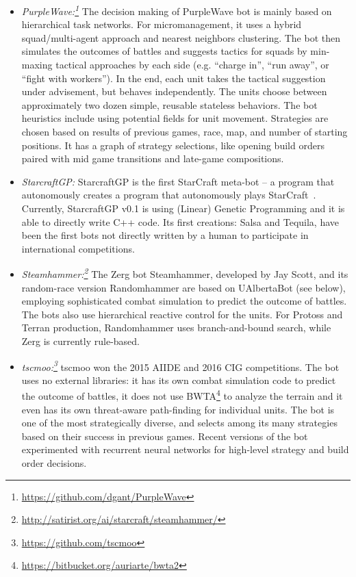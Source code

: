 \begin{itemize}
  \item {\em PurpleWave:\footnote{\url{https://github.com/dgant/PurpleWave}}} The decision making of PurpleWave bot is mainly based on hierarchical task networks. For micromanagement, it uses a hybrid squad/multi-agent approach and nearest neighbors clustering. The bot then simulates the outcomes of battles and suggests tactics for squads by min-maxing tactical approaches by each side (e.g. ``charge in'', ``run away'', or ``fight with workers''). In the end, each unit takes the tactical suggestion under advisement, but behaves independently. The units choose between approximately two dozen simple, reusable stateless behaviors. The bot heuristics include using potential fields for unit movement. Strategies are chosen based on results of previous games, race, map, and number of starting positions. It has a graph of strategy selections, like opening build orders paired with mid game transitions and late-game compositions.
  	
  \item {\em StarcraftGP:} StarcraftGP is the first StarCraft meta-bot -- a program that autonomously creates a program that autonomously plays StarCraft~\cite{garcia2015towards}. Currently, StarcraftGP v0.1 is using (Linear) Genetic Programming and it is able to directly write C++ code. Its first creations: Salsa and Tequila, have been the first bots not directly written by a human to participate in international competitions.

  \item {\em Steamhammer:\footnote{\url{http://satirist.org/ai/starcraft/steamhammer/}}} The Zerg bot Steamhammer, developed by Jay Scott, and its random-race version Randomhammer are based on UAlbertaBot (see below), employing sophisticated combat simulation to predict the outcome of battles. The bots also use hierarchical reactive control for the units. For Protoss and Terran production, Randomhammer uses branch-and-bound search, while Zerg is currently rule-based. 

  \item {\em tscmoo:\footnote{\url{https://github.com/tscmoo}}} tscmoo won the 2015 AIIDE and 2016 CIG competitions. The bot uses no external libraries: it has its own combat simulation code to predict the outcome of battles, it does not use BWTA\footnote{\url{https://bitbucket.org/auriarte/bwta2}} to analyze the terrain and it even has its own threat-aware path-finding for individual units. The bot is one of the most strategically diverse, and selects among its many strategies based on their success in previous games. Recent versions of the bot experimented with recurrent neural networks for high-level strategy and build order decisions.


\end{itemize}

